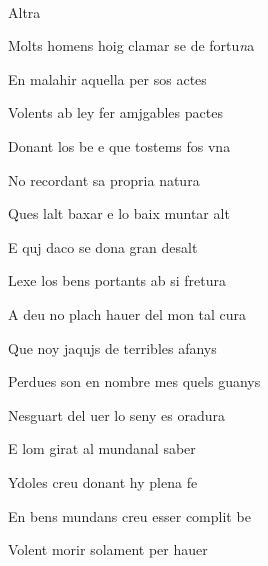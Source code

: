 \documentclass[12pt]{article}
\renewcommand{\espaiAbansEtiquetaPoema}{\vspace{0ex}}
\begin{document}
\begin{estrofa}

\espaiAbansEtiquetaPoema

\\

\begin{rubrica}

Altra

\end{rubrica}
 
\end{estrofa}


\begin{estrofa}

 Molts homens hoig clamar se de fortu\textit{n}a

 En malahir aquella per sos actes

 Volents ab ley fer amjgables pactes

 Donant los be e que tostems fos vna

 No recordant sa propria natura

 Ques lalt baxar e lo baix muntar alt

 E quj daco se dona gran desalt

 Lexe los bens portants ab si fretura

\end{estrofa}



\begin{estrofa}

 A deu no plach hauer del mon tal cura

 Que noy jaqujs de terribles afanys

 Perdues son en nombre mes quels guanys

 Nesguart del uer lo seny es oradura

 E lom girat al mundanal saber

 Ydoles creu donant hy plena fe

 En bens mundans creu esser complit be

 Volent morir solament per hauer

\end{estrofa}
\end{document}

